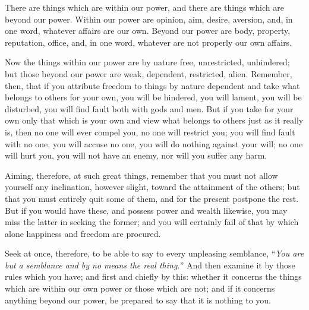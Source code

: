 There are things which are within our power, and there are things which
are beyond our power. Within our power are opinion, aim, desire,
aversion, and, in one word, whatever affairs are our own. Beyond our
power are body, property, reputation, office, and, in one word, whatever
are not properly our own affairs.

Now the things within our power are by nature free, unrestricted,
unhindered; but those beyond our power are weak, dependent, restricted,
alien. Remember, then, that if you attribute freedom to things by nature
dependent and take what belongs to others for your own, you will be
hindered, you will lament, you will be disturbed, you will find fault
both with gods and men. But if you take for your own only that which is
your own and view what belongs to others just as it really is, then no
one will ever compel you, no one will restrict you; you will find fault
with no one, you will accuse no one, you will do nothing against your
will; no one will hurt you, you will not have an enemy, nor will you
suffer any harm.

Aiming, therefore, at such great things, remember that you must not allow
yourself any inclination, however slight, toward the attainment of the
others; but that you must entirely quit some of them, and for the present
postpone the rest. But if you would have these, and possess power and
wealth likewise, you may miss the latter in seeking the former; and you
will certainly fail of that by which alone happiness and freedom are
procured.

Seek at once, therefore, to be able to say to every unpleasing semblance,
``\emph{You are but a semblance and by no means the real thing.}'' And then
examine it by those rules which you have; and first and chiefly by this:
whether it concerns the things which are within our own power or those
which are not; and if it concerns anything beyond our power, be prepared
to say that it is nothing to you.
